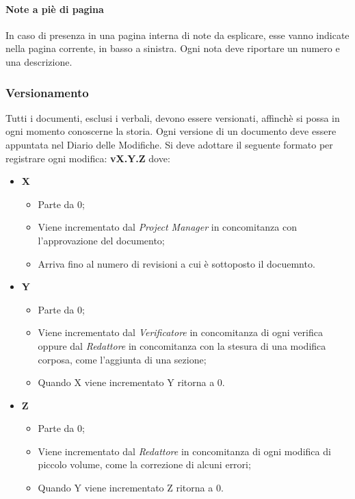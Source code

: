 \paragraph{Note a piè di pagina} \Spazio
In caso di presenza in una pagina interna di note da esplicare, esse vanno indicate nella pagina corrente, in basso a sinistra. Ogni nota deve riportare un numero e una	descrizione.

\subsubsection{Versionamento}
\label{versionamento}
Tutti i documenti, esclusi i verbali, devono essere versionati, affinchè si possa in ogni momento conoscerne la storia. Ogni versione di un documento deve essere appuntata nel Diario delle Modifiche. Si deve adottare il seguente formato per registrare ogni modifica:
\textbf{v{X}.{Y}.{Z}}
dove:
\begin{itemize}
	\item \textbf{X}
	      \begin{itemize}
		      \item Parte da 0;
		      \item Viene incrementato dal \textit{Project Manager} in concomitanza con l'approvazione del documento;
		      \item Arriva fino al numero di revisioni a cui è sottoposto il docuemnto.
	      \end{itemize}

	\item \textbf{Y}
	      \begin{itemize}
		      \item Parte da 0;
		      \item Viene incrementato dal \emph{Verificatore} in concomitanza di ogni verifica oppure dal \emph{Redattore} in concomitanza con la stesura di una modifica corposa, come l'aggiunta di una sezione;
		      \item Quando X viene incrementato Y ritorna a 0.
	      \end{itemize}

	\item \textbf{Z}
	      \begin{itemize}
		      \item Parte da 0;
		      \item Viene incrementato dal \textit{Redattore} in concomitanza di ogni modifica di piccolo volume, come la correzione di alcuni errori;
		      \item Quando Y viene incrementato Z	 ritorna a 0.
	      \end{itemize}

\end{itemize}

